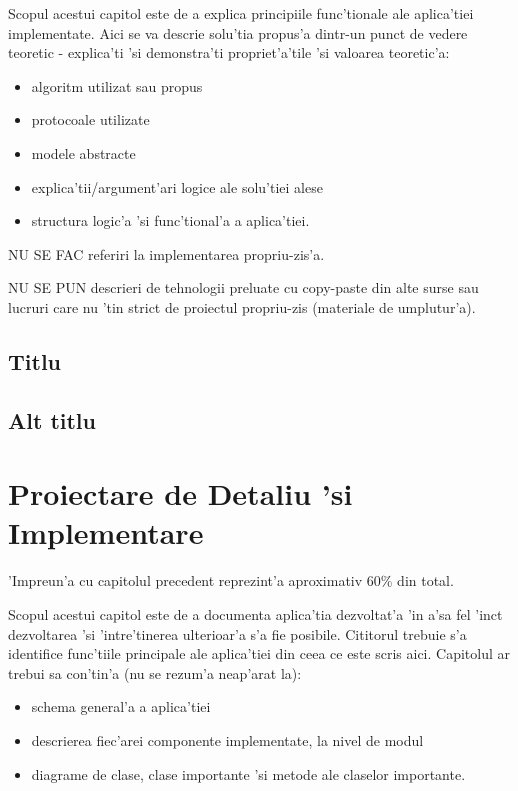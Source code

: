 \documentclass[12pt,a4paper,twoside]{report}
\begin{document}
Scopul acestui capitol este de a explica principiile func'tionale ale aplica'tiei implementate. 
Aici se va descrie solu'tia propus'a dintr-un punct de vedere teoretic - explica'ti 'si demonstra'ti propriet'a'tile 'si valoarea teoretic'a:
\begin{itemize}
 \item algoritm utilizat sau propus
\item protocoale utilizate
\item modele abstracte
\item explica'tii/argument'ari logice ale solu'tiei alese
\item structura logic'a 'si func'tional'a a aplica'tiei.
\end{itemize}

{\color{red}
NU SE FAC referiri la implementarea propriu-zis'a. 

NU SE PUN descrieri de tehnologii preluate cu copy-paste din alte surse sau lucruri care nu 'tin strict de proiectul propriu-zis (materiale de umplutur'a).
}


\section{Titlu}
\section{Alt titlu}


\chapter{Proiectare de Detaliu 'si Implementare}

'Impreun'a cu capitolul precedent reprezint'a aproximativ 60\% din total.

Scopul acestui capitol este de a documenta aplica'tia dezvoltat'a 'in a'sa fel 'inc\ia t dezvoltarea 'si 'intre'tinerea ulterioar'a s'a fie posibile. 
Cititorul trebuie s'a identifice func'tiile principale ale aplica'tiei din ceea ce este scris aici.
Capitolul ar trebui sa con'tin'a (nu se rezum'a neap'arat la):
\begin{itemize}
 \item schema general'a a aplica'tiei
\item descrierea fiec'arei componente implementate, la nivel de modul
\item diagrame de clase, clase importante 'si metode ale claselor importante.
\end{itemize}
\end{document}
